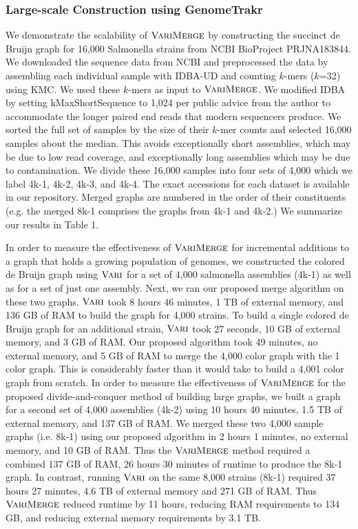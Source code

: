 \subsubsection{Large-scale Construction using GenomeTrakr}

We demonstrate the scalability of $\mbox{\rm {\sc VariMerge}}$ by constructing the succinct  de Bruijn graph for 16,000
Salmonella strains from  NCBI BioProject PRJNA183844. We downloaded the sequence data from NCBI and preprocessed the data by assembling each individual sample with IDBA-UD  and counting  $k$-mers ($k$=32) using KMC.  We used these $k$-mers as input to $\mbox{\rm {\sc VariMerge}}$.  We modified IDBA by setting kMaxShortSequence to 1,024 per public advice from the author to accommodate the longer paired end reads that modern sequencers produce.  We sorted the full set of samples by the size of their $k$-mer counts and selected 16,000 samples about the median.  This avoids exceptionally short assemblies, which may be due to low read coverage, and exceptionally long assemblies which may be due to contamination.  We divide these 16,000 samples into four sets of 4,000 which we label 4k-1, 4k-2, 4k-3, and 4k-4. The exact accessions for each dataset is available in our repository. Merged graphs are numbered in the order of their constituents (e.g. the merged 8k-1 comprises the graphs from 4k-1 and 4k-2.)   We summarize our results in Table 1.

In order to measure the effectiveness of $\mbox{\rm {\sc VariMerge}}$ for incremental additions to a graph that holds a growing population of genomes, we constructed the colored de Bruijn graph using $\mbox{\rm {\sc Vari}}$ for a set of 4,000 salmonella assemblies (4k-1) as well as for a set of just one assembly.  Next, we ran our proposed merge algorithm on these two graphs.  $\mbox{\rm {\sc Vari}}$ took 8 hours 46 minutes, 1 TB of external memory, and 136 GB of RAM to build the graph for 4,000 strains.  To build a single colored de Bruijn graph for an additional strain, $\mbox{\rm {\sc Vari}}$ took 27 seconds, 10 GB of external memory, and 3 GB of RAM.  Our proposed  algorithm took 49 minutes, no external memory, and 5 GB of RAM to merge the 4,000 color graph with the 1 color graph. This is considerably faster than it would take to build a 4,001 color graph from scratch.
In order to measure the effectiveness of $\mbox{\rm {\sc VariMerge}}$ for the proposed divide-and-conquer method of building large graphs, we built a graph for a second set of 4,000 assemblies (4k-2) using 10 hours 40 minutes, 1.5 TB of external memory, and 137 GB of RAM.  We merged these two 4,000 sample graphs (i.e. 8k-1) using our proposed algorithm in 2 hours 1 minutes, no external memory, and 10 GB of RAM.  Thus the $\mbox{\rm {\sc VariMerge}}$ method required a combined 137 GB of RAM, 26 hours 30 minutes of runtime to produce the 8k-1 graph.   In contrast, running $\mbox{\rm {\sc Vari}}$ on the same 8,000 strains (8k-1) required 37 hours 27 minutes, 4.6 TB of external memory and 271 GB of RAM. Thus $\mbox{\rm {\sc VariMerge}}$ reduced runtime by 11 hours, reducing RAM requirements to 134 GB, and reducing external memory requirements by 3.1 TB.

